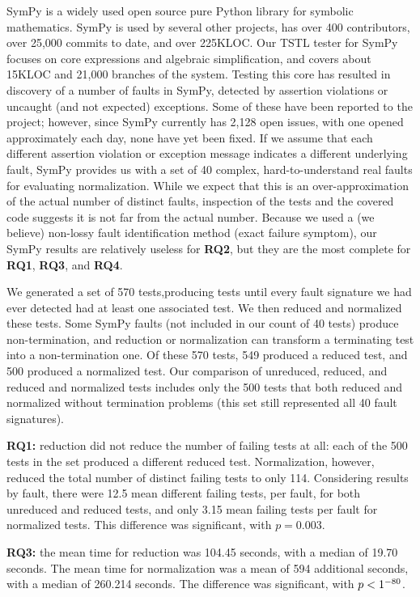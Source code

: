 SymPy \cite{SymPy} is a widely used open source pure Python library
for symbolic mathematics.  SymPy is used by several other projects,
has over 400 contributors, over 25,000 commits to date, and over
225KLOC.  Our TSTL tester for SymPy focuses on core expressions and
algebraic simplification, and covers about 15KLOC and 21,000 branches of
the system.  Testing this core has resulted in discovery of a number
of faults in SymPy, detected by assertion violations or uncaught (and
not expected) exceptions.  Some of these have been reported to the project;
however, since SymPy currently has 2,128 open issues, with one opened
approximately each day, none have yet been fixed.  If we assume that
each different assertion violation or exception message indicates a
different underlying fault, SymPy provides us with a set of 40
complex, hard-to-understand real faults for evaluating normalization.
While we expect that this is an over-approximation of the actual
number of distinct faults, inspection of the tests and the covered
code suggests it is not far from the actual number.  Because we used a
(we believe)
non-lossy fault identification method (exact failure symptom), our
SymPy results are relatively useless for {\bf RQ2}, but they are the
most complete for {\bf RQ1}, {\bf RQ3}, and {\bf RQ4}.

We generated a set of 570 tests,producing tests until every fault
signature we had ever detected had at least one associated test.  We
then reduced and normalized these tests.  Some SymPy faults (not
included in our count of 40 tests) produce non-termination, and
reduction or normalization can transform a terminating test into a
non-termination one.  Of these 570 tests, 549 produced a reduced test,
and 500 produced a normalized test.  Our comparison of unreduced,
reduced, and reduced and normalized tests includes only the 500 tests
that both reduced and normalized without termination problems (this
set still represented all 40 fault signatures).

{\bf RQ1:} reduction did not reduce the number of failing tests at
all:  each of the 500 tests in the set produced a different reduced
test.  Normalization, however, reduced the total number of distinct
failing tests to only 114.  Considering results by fault, there were
12.5 mean different failing tests, per fault, for both unreduced and
reduced tests, and only 3.15 mean failing tests per fault for
normalized tests.  This difference was significant, with $p=0.003$.

{\bf RQ3:} the mean time for reduction was 104.45 seconds, with a
median of 19.70 seconds.  The mean time for normalization was a mean of
594 additional seconds, with a median of 260.214 seconds.  The
difference was significant, with $p<1\time10^{-80}$.


